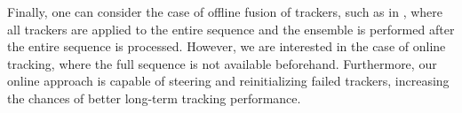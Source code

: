 
Finally, one can consider the case of offline fusion of trackers, such as in
\cite{Bailer2014}, where all trackers are applied to the entire sequence
and the ensemble is performed after the entire sequence is processed.
However, we are interested in the case of online tracking,
where the full sequence is not available beforehand. Furthermore, our online
approach is capable of steering and reinitializing failed trackers, increasing
the chances of better long-term tracking performance.

